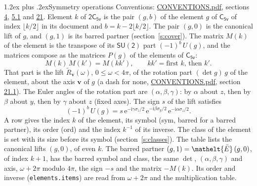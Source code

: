 \documentclass[10pt,a4paper]{article}
\makeatletter
\renewcommand\section{\@startsection{section}{1}{\z@}{-3ex plus -1ex minus -.2ex}%
  {1.2ex plus .2ex}{\normalfont\large\sffamily\bfseries\color{parttitle}}}
\numberwithin{equation}{section}
\newcommand{\eltfont}[1]{{\let\sigma\eltsigma\mathelt{#1}}}
\newcommand{\grp}[1]{\mathsf{#1}}
\newcommand{\elt}[1]{\eltfont{#1}}
\newcommand{\vv}{\mathbf{v}}
\newcommand{\iunit}{\mathrm{i}}
\newcommand{\expe}{\mathrm{e}}
\newcommand{\barred}[1]{\bar{#1}}
\newcommand{\lift}[1]{\tilde{#1}}
\newcommand{\pauli}[1]{\sigma_{#1}}
\makeatother
\begin{document}
\section{Symmetry operations}\label{s:elements}
Conventions: \href{../../CONVENTIONS.pdf}{CONVENTIONS.pdf}, sections \href{../../../rotation/CONVENTIONS.pdf\#conv.4}{4}, \href{../../../rotation/CONVENTIONS.pdf\#conv.5.1}{5.1} and \href{../../CONVENTIONS.pdf\#conv.21}{21}.
\leavevmode\label{n:index.element}\label{n:element.g}Element $k$ of $\grp{2C_{5v}}$ is the pair $(g, b)$ of the element $g$ of \href{../../../rotation/data/pdf/C5v.pdf}{$\grp{C_{5v}}$} of index $\lfloor k/2\rfloor$ in its document and $b = k - 2\lfloor k/2\rfloor$. The pair $(g, 0)$ is the canonical lift of $g$, and $(g, 1)$ is its barred partner (section~\ref{s:cover}). \label{n:matrix.element.pin}\label{n:matrix.element}The matrix $M(k)$ of the element is the transpose of its $\grp{SU(2)}$ part $(-1)^{b}\,U(g)$, and the matrices compose as the matrices $P(g)$ of the elements of $\grp{C_{5v}}$:
\begin{equation}\label{e:mprod}M(k)\,M(k') = M(kk'),\qquad kk' = \text{first } k\text{, then } k'.\end{equation}
\leavevmode\label{n:angle.omega}\label{n:vector.axis}\label{n:vector.pole}That part is the lift $\lift{R}_{\vv}(\omega)$, $0 \le \omega < 4\pi$, of the rotation part $(\det g)\,g$ of the element, about the axis $\vv$ of $g$ (a dash for none, \href{../../CONVENTIONS.pdf}{CONVENTIONS.pdf}, section \href{../../CONVENTIONS.pdf\#conv.21.1}{21.1}). \label{n:angle.euler.alpha}\label{n:angle.euler.beta}\label{n:angle.euler.gamma}\label{n:vector.coordinates}The Euler angles of the rotation part are $(\alpha,\beta,\gamma)$: by $\alpha$ about $z$, then by $\beta$ about $y$, then by $\gamma$ about $z$ (fixed axes). \label{n:local.euler.sign}The sign $s$ of the lift satisfies
\begin{equation}\label{e:euler}(-1)^{b}\,U(g) = s\,\expe^{-\iunit\gamma\pauli{z}/2}\,\expe^{-\iunit\beta\pauli{y}/2}\,\expe^{-\iunit\alpha\pauli{z}/2}.\end{equation}
\leavevmode\label{n:index.element.inverse}\label{n:head.sym}\label{n:head.ord}A row gives the index $k$ of the element, its symbol (sym, barred for a barred partner), its order (ord) and the index $k^{-1}$ of its inverse. \label{n:head.class}The class of the element is set with its size before its symbol (section~\ref{s:classes}).
The table lists the canonical lifts $(g, 0)$, of even $k$. The barred partner $(g, 1) = \elt{\barred{E}}\,(g, 0)$, of index $k + 1$, has the barred symbol and class, the same $\det$, $(\alpha,\beta,\gamma)$ and axis, $\omega + 2\pi$ modulo $4\pi$, the sign $-s$ and the matrix $-M(k)$. Its order and inverse (\texttt{elements.items}) are read from $\omega + 2\pi$ and the multiplication table.
\end{document}
